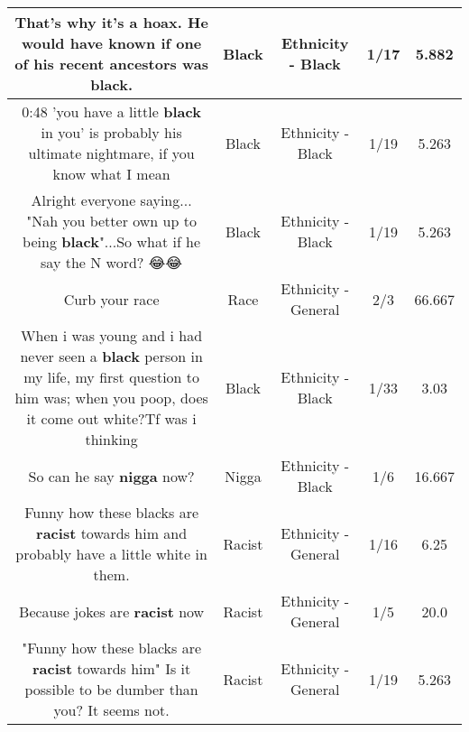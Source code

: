 \documentclass[11pt]{article}
\newlength\mylength
\begin{document}
\begin{center}
\begin{longtable}{|C{.65\mylength}|C{.30\mylength}|C{.12\mylength}|C{.12\mylength}|C{.12\mylength}|}
  \small That's why it's a hoax. He would have known if one of his recent ancestors was \textbf{black}.\normalsize   & Black & Ethnicity - Black & 1/17 & 5.882 \\  \hline
  \small 0:48 'you have a little \textbf{black} in you' is probably his ultimate nightmare, if you know what I mean\normalsize   & Black & Ethnicity - Black & 1/19 & 5.263 \\  \hline
  \small Alright everyone saying... "Nah you better own up to being \textbf{black}"...So what if he say the N word? 😂😂\normalsize   & Black & Ethnicity - Black & 1/19 & 5.263 \\  \hline
  \small Curb your race\normalsize   & Race & Ethnicity - General & 2/3 & 66.667 \\  \hline
  \small When i was young and i had never seen a \textbf{black} person in my life, my first question to him was; when you poop, does it come out white?Tf was i thinking\normalsize   & Black & Ethnicity - Black & 1/33 & 3.03 \\  \hline
  \small So can he say \textbf{nigga} now?\normalsize   & Nigga & Ethnicity - Black & 1/6 & 16.667 \\  \hline
  \small Funny how these blacks are \textbf{racist} towards him and probably have a little white in them.\normalsize   & Racist & Ethnicity - General & 1/16 & 6.25 \\  \hline
  \small Because jokes are \textbf{racist} now\normalsize   & Racist & Ethnicity - General & 1/5 & 20.0 \\  \hline
  \small "Funny how these blacks are \textbf{racist} towards him"  Is it possible to be dumber than you?   It seems not.\normalsize   & Racist & Ethnicity - General & 1/19 & 5.263 \\  \hline

\end{longtable}
\end{center}
\end{document}
